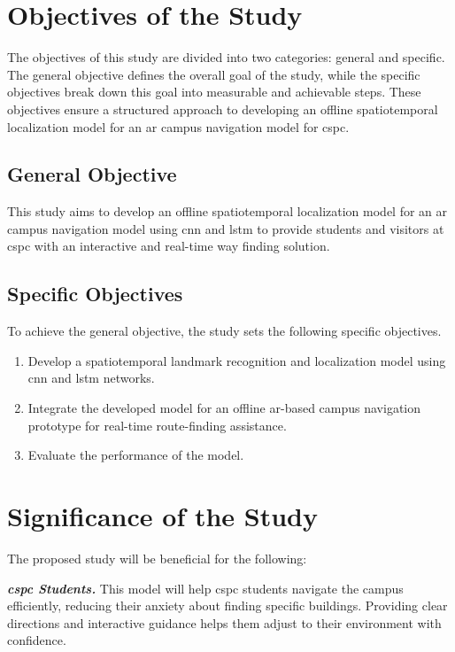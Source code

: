 \begin{refsection}
\section{Objectives of the Study}

The objectives of this study are divided into two categories: general and specific. The general objective defines the overall goal of the study, while the specific objectives break down this goal into measurable and achievable steps. These objectives ensure a structured approach to developing an offline spatiotemporal localization model for an \gls{ar} campus navigation model for \gls{cspc}.

\subsection{General Objective}

This study aims to develop an offline spatiotemporal localization model for an \gls{ar} campus navigation model using \gls{cnn} and \gls{lstm} to provide students and visitors at \gls{cspc} with an interactive and real-time way finding solution.

\subsection{Specific Objectives}

To achieve the general objective, the study sets the following specific objectives.

\begin{enumerate}
    \item Develop a spatiotemporal landmark recognition and localization model using \gls{cnn} and \gls{lstm} networks.
    \item Integrate the developed model for an offline \gls{ar}-based campus navigation prototype for real-time route-finding assistance. 
    \item Evaluate the performance of the model.
\end{enumerate}

\section{Significance of the Study}

The proposed study will be beneficial for the following:

\textit{\textbf{\gls{cspc} Students.}} This model will help \gls{cspc} students navigate the campus efficiently, reducing their anxiety about finding specific buildings. Providing clear directions and interactive guidance helps them adjust to their environment with confidence.


\end{refsection}
